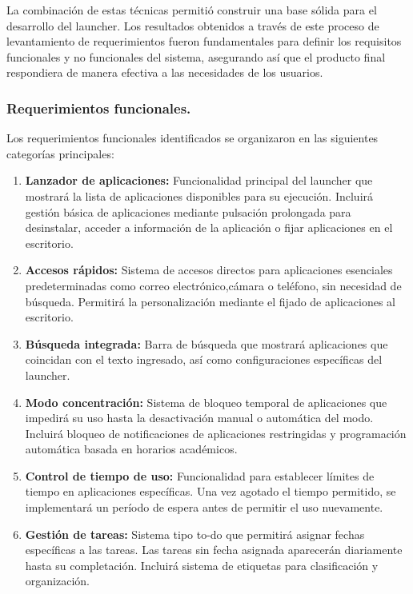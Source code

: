 La combinación de estas técnicas permitió construir una base sólida para el desarrollo del launcher. Los resultados obtenidos a través de este proceso de levantamiento de requerimientos fueron fundamentales para definir los requisitos funcionales y no funcionales del sistema, asegurando así que el producto final respondiera de manera efectiva a las necesidades de los usuarios.

\subsubsection{Requerimientos funcionales.}

Los requerimientos funcionales identificados se organizaron en las siguientes categorías principales:

\begin{enumerate}
    \item \textbf{Lanzador de aplicaciones:} Funcionalidad principal del launcher que mostrará la lista de aplicaciones disponibles para su ejecución. Incluirá gestión básica de aplicaciones mediante pulsación prolongada para desinstalar, acceder a información de la aplicación o fijar aplicaciones en el escritorio.
    
    \item \textbf{Accesos rápidos:} Sistema de accesos directos para aplicaciones esenciales predeterminadas como correo electrónico,cámara o teléfono, sin necesidad de búsqueda. Permitirá la personalización mediante el fijado de aplicaciones al escritorio.
    
    \item \textbf{Búsqueda integrada:} Barra de búsqueda que mostrará aplicaciones que coincidan con el texto ingresado, así como configuraciones específicas del launcher.
    
    \item \textbf{Modo concentración:} Sistema de bloqueo temporal de aplicaciones que impedirá su uso hasta la desactivación manual o automática del modo. Incluirá bloqueo de notificaciones de aplicaciones restringidas y programación automática basada en horarios académicos.
    
    \item \textbf{Control de tiempo de uso:} Funcionalidad para establecer límites de tiempo en aplicaciones específicas. Una vez agotado el tiempo permitido, se implementará un período de espera antes de permitir el uso nuevamente.
    
    \item \textbf{Gestión de tareas:} Sistema tipo to-do que permitirá asignar fechas específicas a las tareas. Las tareas sin fecha asignada aparecerán diariamente hasta su completación. Incluirá sistema de etiquetas para clasificación y organización.
    

\end{enumerate}
